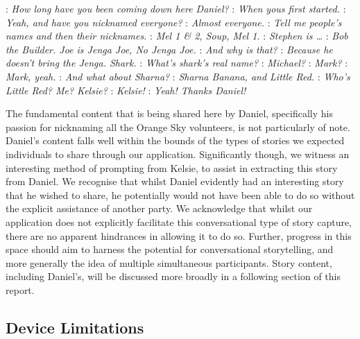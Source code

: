 \begin{drama}

    \kelsspeaks: \emph{How long have you been coming down here Daniel?}
    \danspeaks: \emph{When yous first started.}
    \kelsspeaks: \emph{Yeah, and have you nicknamed everyone?}
    \danspeaks: \emph{Almost everyone.}
    \kelsspeaks: \emph{Tell me people's names and then their nicknames.}
    \danspeaks: \emph{Mel 1 \& 2, Soup, Mel 1.}
    \kelsspeaks: \emph{Stephen is \dots}
    \danspeaks: \emph{Bob the Builder. Joe is Jenga Joe, No Jenga Joe.}
    \kelsspeaks: \emph{And why is that?}
    \danspeaks: \emph{Because he doesn't bring the Jenga. Shark.}
    \kelsspeaks: \emph{What's shark's real name?}
    \danspeaks: \emph{Michael?}
    \kelsspeaks: \emph{Mark?}
    \danspeaks: \emph{Mark, yeah.}
    \kelsspeaks: \emph{And what about Sharna?}
    \danspeaks: \emph{Sharna Banana, and Little Red.}
    \kelsspeaks: \emph{Who's Little Red? Me? Kelsie?}
    \danspeaks: \emph{Kelsie!}
    \kelsspeaks: \emph{Yeah! Thanks Daniel!}
\end{drama}

The fundamental content that is being shared here by Daniel, specifically his passion for nicknaming all the Orange Sky volunteers, is not particularly of note. Daniel's content falls well within the bounds of the types of stories we expected individuals to share through our application. Significantly though, we witness an interesting method of prompting from Kelsie, to assist in extracting this story from Daniel. We recognise that whilst Daniel evidently had an interesting story that he wished to share, he potentially would not have been able to do so without the explicit assistance of another party. We acknowledge that whilst our application does not explicitly facilitate this conversational type of story capture, there are no apparent hindrances in allowing it to do so. Further, progress in this space should aim to harness the potential for conversational storytelling, and more generally the idea of multiple simultaneous participants. Story content, including Daniel's, will be discussed more broadly in a following section of this report.

\subsection{Device Limitations}

